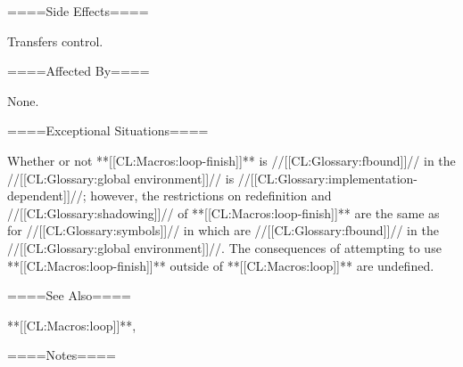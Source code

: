 ====Side Effects====

Transfers control.

====Affected By====

None.

====Exceptional Situations====

Whether or not **[[CL:Macros:loop-finish]]** is //[[CL:Glossary:fbound]]// in the //[[CL:Glossary:global environment]]// is //[[CL:Glossary:implementation-dependent]]//; however, the restrictions on redefinition and //[[CL:Glossary:shadowing]]// of **[[CL:Macros:loop-finish]]** are the same as for //[[CL:Glossary:symbols]]// in  which are //[[CL:Glossary:fbound]]// in the //[[CL:Glossary:global environment]]//. The consequences of attempting to use **[[CL:Macros:loop-finish]]** outside of **[[CL:Macros:loop]]** are undefined.

====See Also====

**[[CL:Macros:loop]]**, {\secref\LoopFacility}

====Notes====

